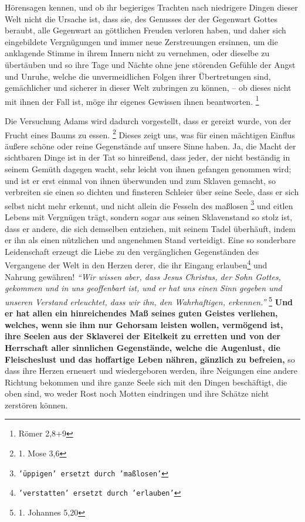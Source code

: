 {{Hörensagen kennen, und ob ihr begieriges Trachten nach niedrigere Dingen dieser
Welt nicht die Ursache ist, dass sie, des Genusses der der Gegenwart Gottes beraubt,
alle Gegenwart an göttlichen Freuden verloren haben, und daher sich
eingebildete Vergnügungen und immer neue Zerstreuungen ersinnen, um die
anklagende Stimme in ihrem Innern nicht zu vernehmen, oder dieselbe zu
übertäuben und so ihre Tage und Nächte ohne jene störenden Gefühle der Angst
und Unruhe, welche die unvermeidlichen Folgen ihrer Übertretungen sind,
gemächlicher und sicherer in dieser Welt zubringen zu können, -- ob dieses nicht
mit ihnen der Fall ist, möge ihr eigenes Gewissen ihnen
beantworten.}
\footnote{Römer 2,8+9}

\medskip

Die Versuchung Adams wird dadurch vorgestellt, dass er gereizt wurde, von der
Frucht eines Baums zu essen.
\footnote{1. Mose 3,6}
Dieses zeigt uns, was für
einen mächtigen Einflus äußere schöne oder reine Gegenstände auf unsere Sinne
haben. Ja, die Macht der sichtbaren Dinge ist in der Tat so hinreißend, dass
jeder, der nicht beständig in seinem Gemüth dagegen wacht, sehr leicht von
ihnen gefangen genommen wird; und ist er erst einmal von ihnen überwunden und
zum Sklaven gemacht, so verbreiten sie einen so dichten
und finsteren Schleier
über seine Seele, dass er sich selbst nicht mehr erkennt, und nicht allein die
Fesseln des maßlosen
\footnote{\texttt{'üppigen' ersetzt durch 'maßlosen'}} und eitlen Lebens mit
Vergnügen trägt, sondern sogar aus
seinen Sklavenstand so stolz ist, dass er andere, die sich
demselben entziehen,
mit seinem Tadel überhäuft, indem er ihn als einen nützlichen und angenehmen
Stand verteidigt. Eine so sonderbare Leidenschaft erzeugt die Liebe zu den
vergänglichen Gegenständen des Vergangene der Welt in den Herzen derer, die ihr
Eingang erlauben\footnote{\texttt{'verstatten' ersetzt durch 'erlauben'}} und Nahrung gewähren!
\textit{"`Wir wissen aber, dass Jesus Christus,
der Sohn Gottes, gekommen und in uns geoffenbart ist, und er hat uns einen Sinn
gegeben und unseren Verstand erleuchtet, dass wir ihn, den Wahrhaftigen,
erkennen."'}
\footnote{1. Johannes 5,20}
\textbf{Und er hat allen ein hinreichendes Maß seines
guten Geistes verliehen, welches, wenn sie ihm nur Gehorsam leisten wollen,
vermögend ist, ihre Seelen aus der Sklaverei der Eitelkeit zu erretten und von
der Herrschaft aller sinnlichen Gegenstände, welche die Augenlust, die
Fleischeslust und das hoffartige Leben nähren, gänzlich zu befreien,} so dass ihre
Herzen erneuert und wiedergeboren werden, ihre Neigungen
eine andere Richtung
bekommen und ihre ganze Seele sich mit den Dingen beschäftigt, die oben sind,
wo weder Rost noch Motten eindringen und ihre Schätze nicht zerstören können.

}
